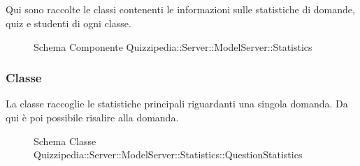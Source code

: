 \subsection{}
Qui sono raccolte le classi contenenti le informazioni sulle statistiche di domande, quiz e studenti di ogni classe.
\begin{figure}[H]
\centering
\noindent{}
\caption[Schema Componente Quizzipedia::Server::ModelServer::Statistics]{Schema Componente Quizzipedia::Server::ModelServer::Statistics}
\end{figure}
\subsubsection{Classe }
La classe raccoglie le statistiche principali riguardanti una singola domanda. Da qui è poi possibile risalire alla domanda.
\begin{figure}[H]
\centering
\noindent{}
\caption[Schema Classe QuestionStatistics]{Schema Classe Quizzipedia::Server::ModelServer::Statistics::QuestionStatistics}
\end{figure}
